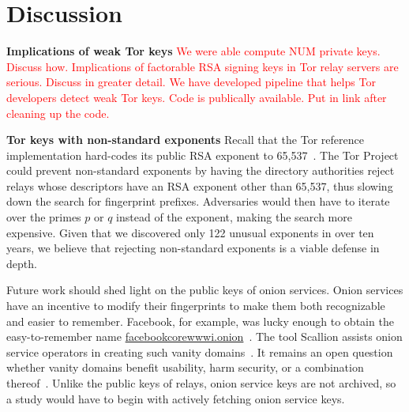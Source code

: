 \section{Discussion}
\label{sec:discussion}
\textbf{Implications of weak Tor keys} \textcolor{red}{We were able compute NUM private keys. Discuss how. Implications of factorable RSA signing keys in Tor relay servers are serious. Discuss in greater detail. We have developed pipeline that helps Tor developers detect weak Tor keys. Code is publically available. Put in link after cleaning up the code.}

\textbf{Tor keys with non-standard exponents} Recall that the Tor reference implementation hard-codes its public RSA exponent
to 65,537~\cite[\S~0.3]{torspec}.  The Tor Project could prevent non-standard
exponents by having the directory authorities reject relays whose descriptors
have an RSA exponent other than 65,537, thus slowing down the search for
fingerprint prefixes.  Adversaries would then have to iterate over the primes
$p$ or $q$ instead of the exponent, making the search more expensive.  Given
that we discovered only 122 unusual exponents in over ten years, we believe that
rejecting non-standard exponents is a viable defense in depth.

Future work should shed light on the public keys of onion services.  Onion
services have an incentive to modify their fingerprints to make them both
recognizable and easier to remember.  Facebook, for example, was lucky enough to
obtain the easy-to-remember name \url{facebookcorewwwi.onion}~\cite{facebook}.
The tool Scallion assists onion service operators in creating such vanity
domains~\cite{scallion}.  It remains an open question whether vanity domains
benefit usability, harm security, or a combination
thereof~\cite{vanity-domains}.  Unlike the public keys of relays, onion service
keys are not archived, so a study would have to begin with actively fetching
onion service keys.
